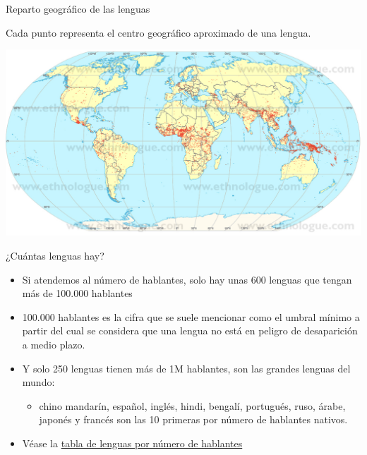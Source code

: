 \documentclass[handout]{beamer}
\begin{document}
\begin{frame}{Reparto geográfico de las lenguas}

Cada punto representa el centro geográfico aproximado de una lengua.

\begin{center} 
  \includegraphics[scale=0.35]{img/wrld_eth.jpg} 
\end{center}
\end{frame}


\begin{frame}{¿Cuántas lenguas hay?}
\begin{itemize}
	\item Si atendemos al número de hablantes, solo hay unas 600 lenguas que tengan más de 100.000 hablantes
	\item 100.000 hablantes es la cifra que se suele mencionar como el umbral mínimo a partir del cual se considera que una lengua no está en peligro de desaparición a medio plazo.
	\item Y solo 250 lenguas tienen más de 1M hablantes, son las grandes lenguas del mundo: 
	\begin{itemize}
		\item chino mandarín, español, inglés, hindi, bengalí, portugués, ruso, árabe, japonés y francés son las 10 primeras por número de hablantes nativos.
	\end{itemize}
	\item Véase la \href{http://es.wikipedia.org/wiki/Anexo:Lenguas_por_n\%C3\%BAmero_de_hablantes}{tabla de lenguas por número de hablantes}
\end{itemize}
\end{frame}
\end{document}
